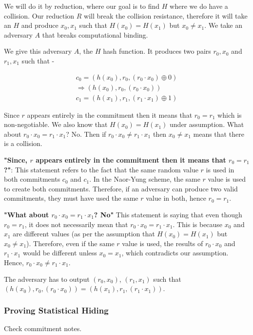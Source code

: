 \documentclass{article}
\begin{document}
We will do it by reduction, where our goal is to find $H$ where we do have a collision. Our reduction $R$ will break the collision resistance, therefore it will take an $H$ and produce $x_0, x_1$ such that $H(x_0) = H(x_1)$ but $x_0 \neq x_1$. We take an adversary $A$ that breaks computational binding.

We give this adversary $A$, the $H$ hash function. It produces two pairs $r_0, x_0$ and $r_1, x_1$ such that -

\begin{align*}
    c_0 = (h(x_0), r_0, (r_0 \cdot x_0) \oplus 0) \\
    \Rightarrow (h(x_0), r_0, (r_0 \cdot x_0)) \\
    c_1 = (h(x_1), r_1, (r_1 \cdot x_1) \oplus 1)
\end{align*}

Since $r$ appears entirely in the commitment then it means that $r_0 = r_1$ which is non-negotiable. We also know that $H(x_0) = H(x_1)$ under assumption. What about $r_0 \cdot x_0 = r_1 \cdot x_1$? No. Then if $r_0 \cdot x_0 \neq r_1 \cdot x_1$ then $x_0 \neq x_1$ means that there is a collision.


\textbf{"Since, $r$ appears entirely in the commitment then it means that $r_0 = r_1$?"}: This statement refers to the fact that the same random value $r$ is used in both commitments $c_0$ and $c_1$. In the Naor-Yung scheme, the same $r$ value is used to create both commitments. Therefore, if an adversary can produce two valid commitments, they must have used the same $r$ value in both, hence $r_0 = r_1$.

\textbf{"What about $r_0 \cdot x_0 = r_1 \cdot x_1$? No"} This statement is saying that even though $r_0 = r_1$, it does not necessarily mean that $r_0 \cdot x_0 = r_1 \cdot x_1$. This is because $x_0$ and $x_1$ are different values (as per the assumption that $H(x_0) = H(x_1)$ but $x_0 \neq x_1$). Therefore, even if the same $r$ value is used, the results of $r_0 \cdot x_0$ and $r_1 \cdot x_1$ would be different unless $x_0 = x_1$, which contradicts our assumption. Hence, $r_0 \cdot x_0 \neq r_1 \cdot x_1$.

The adversary has to output $(r_0,x_0)$, $(r_1,x_1)$ such that $(h(x_0),r_0,(r_0 \cdot x_0)) = (h(x_1),r_1,(r_1 \cdot x_1))$.
   
\subsubsection{Proving Statistical Hiding}

Check commitment notes.

% 
% 
\end{document}
